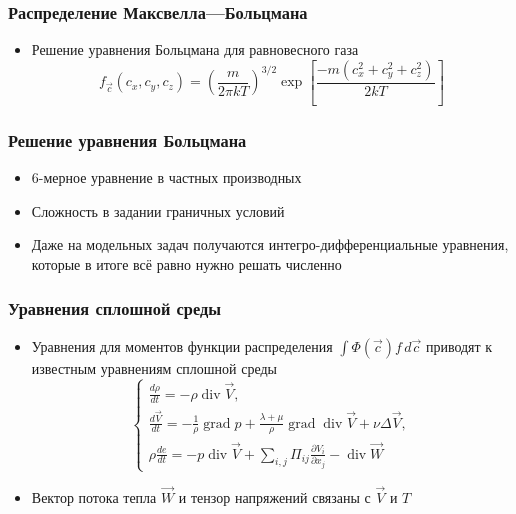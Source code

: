 \documentclass[onlymath]{beamer}
\newcommand{\pardiff}[2]{\frac{\partial{#1}}{\partial{#2}}}
\DeclareMathOperator\diverg{div}
\DeclareMathOperator\gradient{grad}
\begin{document}
\begin{frame}
  \frametitle{Распределение Максвелла—Больцмана}
  \begin{itemize}
  \item Решение уравнения Больцмана для равновесного газа
    \begin{equation*}
      f_{\vec{c}}(c_x, c_y, c_z) = \left(\frac{m}{2\pi k T}\right)^{3/2}
      \exp\left[ \frac{-m(c_x^2 + c_y^2 + c_z^2)}{2kT} \right]
    \end{equation*}
  \end{itemize}
\end{frame}

\begin{frame}
  \frametitle{Решение уравнения Больцмана}
  \begin{itemize}
  \item 6-мерное уравнение в частных производных
  \item Сложность в задании граничных условий
  \item Даже на модельных задач получаются интегро-дифференциальные
    уравнения, которые в итоге всё равно нужно решать численно
  \end{itemize}
\end{frame}

\begin{frame}
  \frametitle{Уравнения сплошной среды}
  
  \begin{itemize}
  \item Уравнения для моментов функции распределения
    $\int\Phi(\vec{c}) f \,d\vec{c}$ приводят к известным уравнениям
    сплошной среды
    \begin{equation*}
      \begin{cases}
        \frac{d\rho}{dt} = -\rho \diverg {\vec{V}},\\
        \frac{d\vec{V}}{dt} = -\frac{1}{\rho}\gradient{p} + \frac{\lambda
          + \mu}{\rho}\gradient\diverg\vec{V} + \nu\Delta\vec{V},\\
        \rho\frac{de}{dt} = -p\diverg\vec{V}+\sum_{i,j}{\Pi_{ij}\pardiff{V_i}{x_j}}-\diverg\vec{W}
      \end{cases}
    \end{equation*}
  \item Вектор потока тепла $\vec{W}$ и тензор напряжений связаны с
    $\vec{V}$ и $T$
  \end{itemize}
\end{frame}
\end{document}
